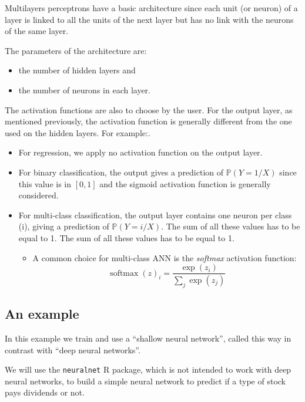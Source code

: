 \documentclass[
  letterpaper,
  DIV=11,
  numbers=noendperiod,
  oneside]{scrartcl}
\providecommand{\tightlist}{%
  \setlength{\itemsep}{0pt}\setlength{\parskip}{0pt}}\usepackage{longtable,booktabs,array}
\begin{document}
Multilayers perceptrons have a basic architecture since each unit (or
neuron) of a layer is linked to all the units of the next layer but has
no link with the neurons of the same layer.

The parameters of the architecture are:

\begin{itemize}
\tightlist
\item
  the number of hidden layers and
\item
  the number of neurons in each layer.
\end{itemize}

The activation functions are also to choose by the user. For the output
layer, as mentioned previously, the activation function is generally
different from the one used on the hidden layers. For example:.

\begin{itemize}
\tightlist
\item
  For regression, we apply no activation function on the output layer.
\item
  For binary classification, the output gives a prediction of
  \(\mathbb{P}(Y=1 / X)\) since this value is in \([0,1]\) and the
  sigmoid activation function is generally considered.
\item
  For multi-class classification, the output layer contains one neuron
  per class (i), giving a prediction of \(\mathbb{P}(Y=i / X)\). The sum
  of all these values has to be equal to 1. The sum of all these values
  has to be equal to 1.

  \begin{itemize}
  \tightlist
  \item
    A common choice for multi-class ANN is the \emph{softmax} activation
    function: \[
    \operatorname{softmax}(z)_{i}=\frac{\exp \left(z_{i}\right)}{\sum_{j} \exp \left(z_{j}\right)}
    \]
  \end{itemize}
\end{itemize}

\hypertarget{an-example}{%
\subsection{An example}\label{an-example}}

In this example we train and use a ``shallow neural network'', called
this way in contrast with ``deep neural networks''.

We will use the \texttt{neuralnet} R package, which is not intended to
work with deep neural networks, to build a simple neural network to
predict if a type of stock pays dividends or not.
\end{document}
